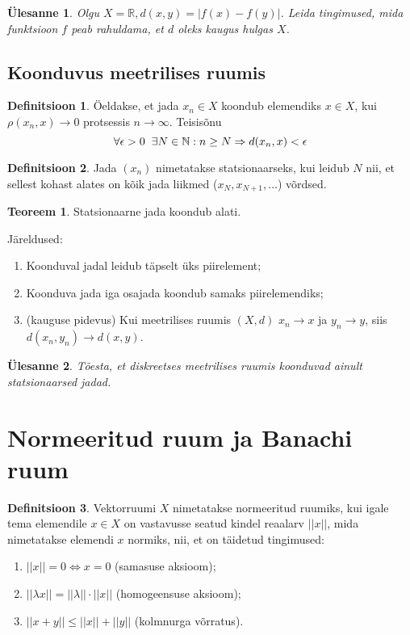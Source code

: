 \documentclass{article}[12pt]
\newcommand{\h}{\hspace{0.2cm}}
\newcommand{\R}{\mathbb{R}}
\newcommand{\N}{\mathbb{N}}
\newtheorem{yl}{Ülesanne}[section]
\theoremstyle{definition}
\newtheorem{definition}{Definitsioon}[section]
\theoremstyle{definition}
\newtheorem{theorem}{Teoreem}[section]
\begin{document}
\begin{yl}
	Olgu $X=\R, d(x,y) = |f(x)-f(y)|$. Leida tingimused, mida funktsioon $f$ peab rahuldama, et $d$ oleks kaugus hulgas $X$.	
\end{yl}

\subsection*{Koonduvus meetrilises ruumis}

\begin{definition}
	Öeldakse, et jada $x_n\in X$ koondub elemendiks $x\in X$, kui $\rho(x_n,x)\rightarrow 0$ protsessis $n\rightarrow \infty$.
	Teisisõnu
	\[
		\forall \epsilon > 0 \h\exists N\in \N : n\geq N\Rightarrow d(x_n,x)<\epsilon
	\]	
\end{definition}
\begin{definition}
	Jada $(x_n)$ nimetatakse statsionaarseks, kui leidub $N$ nii, et sellest kohast alates on kõik jada liikmed ($x_N,x_{N+1},\dots$) võrdsed.
\end{definition}
\begin{theorem}
	Statsionaarne jada koondub alati.
\end{theorem}

Järeldused:
\begin{enumerate}
	\item Koonduval jadal leidub täpselt üks piirelement;
	\item Koonduva jada iga osajada koondub samaks piirelemendiks;
	\item (kauguse pidevus) Kui meetrilises ruumis $(X,d)$ $x_n\rightarrow x$ ja $y_n \rightarrow y$, siis $d(x_n,y_n)\rightarrow d(x,y)$.
\end{enumerate}

\begin{yl}
	Tõesta, et diskreetses meetrilises ruumis koonduvad ainult statsionaarsed jadad.
\end{yl}

\section{Normeeritud ruum ja Banachi ruum}

\begin{definition}
	Vektorruumi $X$ nimetatakse normeeritud ruumiks, kui igale tema elemendile $x\in X$ on vastavusse seatud kindel reaalarv $||x||$, mida nimetatakse elemendi $x$ normiks, nii, et on täidetud tingimused:
	\begin{enumerate}
		\item $||x|| = 0 \Leftrightarrow x=0$ (samasuse aksioom);
		\item $||\lambda x|| = ||\lambda||\cdot ||x||$ (homogeensuse aksioom);
		\item $||x+y|| \leq ||x|| + ||y||$ (kolmnurga võrratus).
	\end{enumerate}	
\end{definition}
\end{document}
